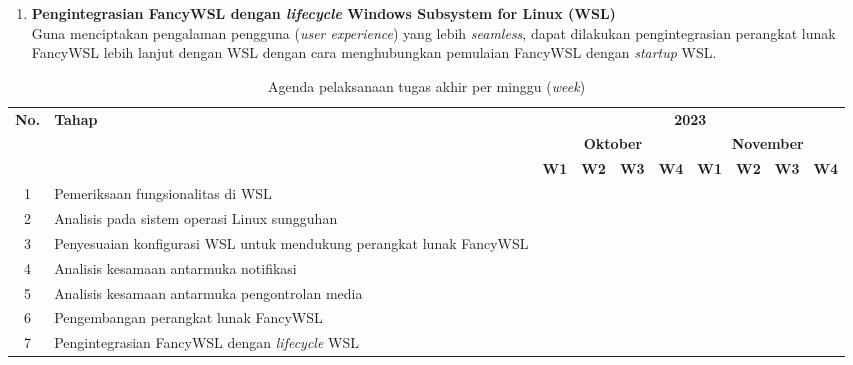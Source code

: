 \begin{enumerate}
    \item \textbf{Pengintegrasian FancyWSL dengan \textit{lifecycle} Windows Subsystem for Linux (WSL)}\\
    Guna menciptakan pengalaman pengguna (\textit{user experience}) yang lebih \textit{seamless}, dapat dilakukan pengintegrasian perangkat lunak FancyWSL lebih lanjut dengan WSL dengan cara menghubungkan pemulaian FancyWSL dengan \textit{startup} WSL.
\end{enumerate}

\begin{table}
    \centering
    \caption{Agenda pelaksanaan tugas akhir per minggu (\textit{week})}
    \begin{tabular}{|c|p{4cm}|c|c|c|c|c|c|c|c|} \hline 
        \multirow{3}{*}{\textbf{No.}} & \multirow{3}{*}{\textbf{Tahap}} & \multicolumn{8}{c|}{\textbf{2023}}\\ \cline{3-10} 
        & & \multicolumn{4}{c|}{\textbf{Oktober}} & \multicolumn{4}{c|}{\textbf{November}}\\ \cline{3-10} 
        & & \textbf{W1} & \textbf{W2} & \textbf{W3} & \textbf{W4} & \textbf{W1} & \textbf{W2} & \textbf{W3} & \textbf{W4}\\ \hline 
        1 & Pemeriksaan fungsionalitas di WSL & \cellcolor{black} &  &  &  &  &  &  & \\ \hline 
        2 & Analisis pada sistem operasi Linux sungguhan & \cellcolor{black} & \cellcolor{black} &  &  &  &  &  & \\ \hline 
        3 & Penyesuaian konfigurasi WSL untuk mendukung perangkat lunak FancyWSL &  &  & \cellcolor{black} & \cellcolor{black} &  &  &  & \\ \hline 
        4 & Analisis kesamaan antarmuka notifikasi &  &  & \cellcolor{black} & \cellcolor{black} & \cellcolor{black} & &  & \\ \hline 
        5 & Analisis kesamaan antarmuka pengontrolan media &  &  & \cellcolor{black} & \cellcolor{black} & \cellcolor{black} &  &  & \\ \hline 
        6 & Pengembangan perangkat lunak FancyWSL &  &  &  &  & \cellcolor{black} & \cellcolor{black} & \cellcolor{black} & \cellcolor{black}\\ \hline 
        7 & Pengintegrasian FancyWSL dengan \textit{lifecycle} WSL &  &  &  &  &  &  &  & \cellcolor{black}\\ \hline 
    \end{tabular}
    \label{tabel-agenda-pelaksanaan}
\end{table}

